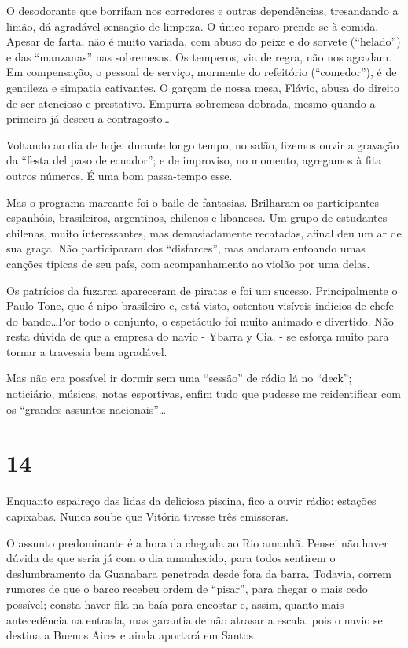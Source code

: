 O desodorante que borrifam nos corredores e outras dependências, tresandando a limão, dá agradável sensação de limpeza. O único reparo prende-se à comida. Apesar de farta, não é muito variada, com abuso do peixe e do sorvete (“helado”) e das “manzanas” nas sobremesas. Os temperos, via de regra, não nos agradam. Em compensação, o pessoal de serviço, mormente do refeitório (“comedor”), é de gentileza e simpatia cativantes. O garçom de nossa mesa, Flávio, abusa do direito de ser atencioso e prestativo. Empurra sobremesa dobrada, mesmo quando a primeira já desceu a contragosto\ldots

Voltando ao dia de hoje: durante longo tempo, no salão, fizemos ouvir a gravação da “festa del paso de ecuador”; e de improviso, no momento, agregamos à fita outros números. É uma bom passa-tempo esse.

Mas o programa marcante foi o baile de fantasias. Brilharam os participantes - espanhóis, brasileiros, argentinos, chilenos e libaneses. Um grupo de estudantes chilenas, muito interessantes, mas demasiadamente recatadas, afinal deu um ar de sua graça. Não participaram dos “disfarces”, mas andaram entoando umas canções típicas de seu país, com acompanhamento ao violão por uma delas.

Os patrícios da fuzarca apareceram de piratas e foi um sucesso. Principalmente o Paulo Tone, que é nipo-brasileiro e, está visto, ostentou visíveis indícios de chefe do bando\ldots Por todo o conjunto, o espetáculo foi muito animado e divertido. Não resta dúvida de que a empresa do navio - Ybarra y Cia. - se esforça muito para tornar a travessia bem agradável.

Mas não era possível ir dormir sem uma “sessão” de rádio lá no “deck”; noticiário, músicas, notas esportivas, enfim tudo que pudesse me reidentificar com os “grandes assuntos nacionais”\ldots

\section*{14 \adfflatleafright {}}
Enquanto espaireço das lidas da deliciosa piscina, fico a ouvir rádio: estações capixabas. Nunca soube que Vitória tivesse três emissoras.

O assunto predominante é a hora da chegada ao Rio amanhã. Pensei não haver dúvida de que seria já com o dia amanhecido, para todos sentirem o deslumbramento da Guanabara penetrada desde fora da barra. Todavia, correm rumores de que o barco recebeu ordem de “pisar”, para chegar o mais cedo possível; consta haver fila na baía para encostar e, assim, quanto mais antecedência na entrada, mas garantia de não atrasar a escala, pois o navio se destina a Buenos Aires e ainda aportará em Santos.


